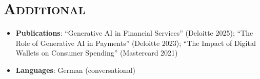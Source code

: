 \documentclass[11pt,a4paper]{moderncv}
\begin{document}
\section{\textsc{Additional}}
\begin{itemize}
\item[\textbullet] \textbf{Publications}: ``Generative AI in Financial Services'' (Deloitte 2025); ``The Role of Generative AI in Payments'' (Deloitte 2023); ``The Impact of Digital Wallets on Consumer Spending'' (Mastercard 2021)
\item[\textbullet] \textbf{Languages}: German (conversational)
\end{itemize}
\vspace{-2pt}
\end{document}
